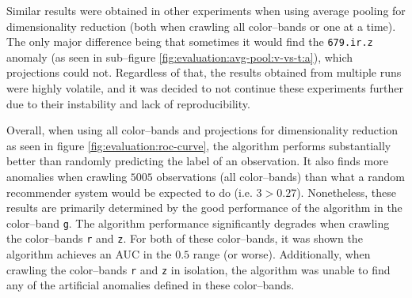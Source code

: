 Similar results were obtained in other experiments when using average pooling for dimensionality reduction (both when crawling all \panstarrs color--bands or one at a time). The only major difference being that sometimes it would find the \texttt{679.ir.z} anomaly (as seen in sub--figure \ref{fig:evaluation:avg-pool:v-vs-t:a}), which projections could not. Regardless of that, the results obtained from multiple runs were highly volatile, and it was decided to not continue these experiments further due to their instability and lack of reproducibility. \newline

Overall, when using all \panstarrs color--bands and projections for dimensionality reduction as seen in figure \ref{fig:evaluation:roc-curve}, the \mlblink algorithm performs substantially better than randomly predicting the label of an observation. It also finds more anomalies when crawling $5005$ observations (all \panstarrs color--bands) than what a random recommender system would be expected to do (i.e. $3 > 0.27$). Nonetheless, these results are primarily determined by the good performance of the \mlblink algorithm in the \panstarrs color--band \texttt{g}. The \mlblink algorithm performance significantly degrades when crawling the \panstarrs color--bands \texttt{r} and \texttt{z}. For both of these color--bands, it was shown the \mlblink algorithm achieves an AUC in the $0.5$ range (or worse). Additionally, when crawling the \panstarrs color--bands \texttt{r} and \texttt{z} in isolation, the \mlblink algorithm was unable to find any of the artificial anomalies defined in these color--bands.
